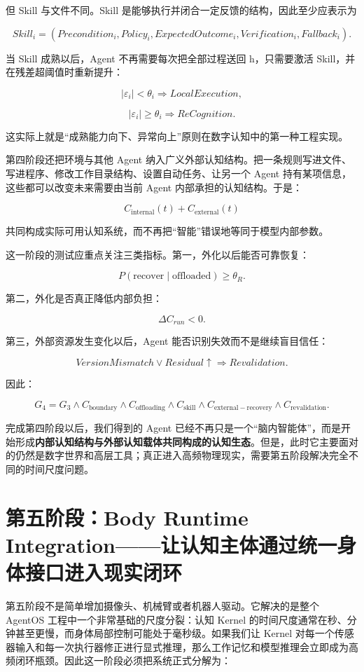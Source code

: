 但 Skill 与文件不同。Skill 是能够执行并闭合一定反馈的结构，因此至少应表示为

\[
Skill_i
=
(
Precondition_i,
Policy_i,
ExpectedOutcome_i,
Verification_i,
Fallback_i
).
\]

当 Skill 成熟以后，Agent 不再需要每次把全部过程送回 h，只需要激活 Skill，并在残差超阈值时重新提升：

\[
|\varepsilon_i|<\theta_i
\Rightarrow
LocalExecution,
\]

\[
|\varepsilon_i|\geq\theta_i
\Rightarrow
ReCognition.
\]

这实际上就是“成熟能力向下、异常向上”原则在数字认知中的第一种工程实现。

第四阶段还把环境与其他 Agent 纳入广义外部认知结构。把一条规则写进文件、写进程序、修改工作目录结构、设置自动任务、让另一个 Agent 持有某项信息，这些都可以改变未来需要由当前 Agent 内部承担的认知结构。于是：

\[
C_{\mathrm{internal}}(t)
+
C_{\mathrm{external}}(t)
\]

共同构成实际可用认知系统，而不再把“智能”错误地等同于模型内部参数。

这一阶段的测试应重点关注三类指标。第一，外化以后能否可靠恢复：

\[
P(\mathrm{recover}\mid\mathrm{offloaded})
\geq
\theta_R.
\]

第二，外化是否真正降低内部负担：

\[
\Delta C_{run}<0.
\]

第三，外部资源发生变化以后，Agent 能否识别失效而不是继续盲目信任：

\[
VersionMismatch
\lor
Residual\uparrow
\Rightarrow
Revalidation.
\]

因此：

\[
G_4
=
G_3
\land
C_{\mathrm{boundary}}
\land
C_{\mathrm{offloading}}
\land
C_{\mathrm{skill}}
\land
C_{\mathrm{external-recovery}}
\land
C_{\mathrm{revalidation}}.
\]

完成第四阶段以后，我们得到的 Agent 已经不再只是一个“脑内智能体”，而是开始形成\textbf{内部认知结构与外部认知载体共同构成的认知生态}。但是，此时它主要面对的仍然是数字世界和高层工具；真正进入高频物理现实，需要第五阶段解决完全不同的时间尺度问题。

\section{第五阶段：Body Runtime Integration——让认知主体通过统一身体接口进入现实闭环}

第五阶段不是简单增加摄像头、机械臂或者机器人驱动。它解决的是整个 AgentOS 工程中一个非常基础的尺度分裂：认知 Kernel 的时间尺度通常在秒、分钟甚至更慢，而身体局部控制可能处于毫秒级。如果我们让 Kernel 对每一个传感器输入和每一次执行器修正进行显式推理，那么工作记忆和模型推理会立即成为高频闭环瓶颈。因此这一阶段必须把系统正式分解为：

